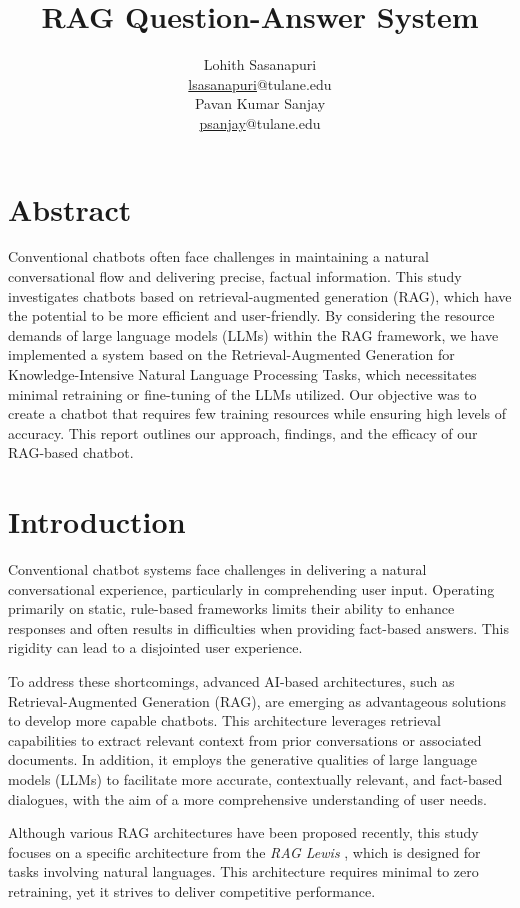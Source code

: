 \documentclass{article}
\title{RAG Question-Answer System}
\author{%
  \begin{minipage}[t]{0.48\textwidth}
    \centering
    Lohith Sasanapuri \\
    \href{mailto:lsasanapuri@tulane.edu}{lsasanapuri}@tulane.edu
  \end{minipage}
  \hfill
  \begin{minipage}[t]{0.48\textwidth}
    \centering
    Pavan Kumar Sanjay \\
     \href{mailto:psanjay@tulane.edu}{psanjay}@tulane.edu
  \end{minipage}
}
\affil[]{
    \textbf{Department of Computer Science} \\
    Tulane University, New Orleans, LA \\   
}
\begin{document}
\maketitle
\section{Abstract}
Conventional chatbots often face challenges in maintaining a natural conversational flow and delivering precise, factual information. This study investigates chatbots based on retrieval-augmented generation (RAG), which have the potential to be more efficient and user-friendly. By considering the resource demands of large language models (LLMs) within the RAG framework, we have implemented a system based on the Retrieval-Augmented Generation for Knowledge-Intensive Natural Language Processing Tasks\cite{RAG_lewis}, which necessitates minimal retraining or fine-tuning of the LLMs utilized. Our objective was to create a chatbot that requires few training resources while ensuring high levels of accuracy. This report outlines our approach, findings, and the efficacy of our RAG-based chatbot.

\section{Introduction}
Conventional chatbot systems face challenges in delivering a natural conversational experience, particularly in comprehending user input. Operating primarily on static, rule-based frameworks limits their ability to enhance responses and often results in difficulties when providing fact-based answers. This rigidity can lead to a disjointed user experience. 

To address these shortcomings, advanced AI-based architectures, such as Retrieval-Augmented Generation (RAG), are emerging as advantageous solutions to develop more capable chatbots. This architecture leverages retrieval capabilities to extract relevant context from prior conversations or associated documents. In addition, it employs the generative qualities of large language models (LLMs) to facilitate more accurate, contextually relevant, and fact-based dialogues, with the aim of a more comprehensive understanding of user needs.

Although various RAG architectures have been proposed recently, this study focuses on a specific architecture from the \textit{RAG Lewis} \cite{RAG_lewis}, which is designed for tasks involving natural languages. This architecture requires minimal to zero retraining, yet it strives to deliver competitive performance.
\end{document}
